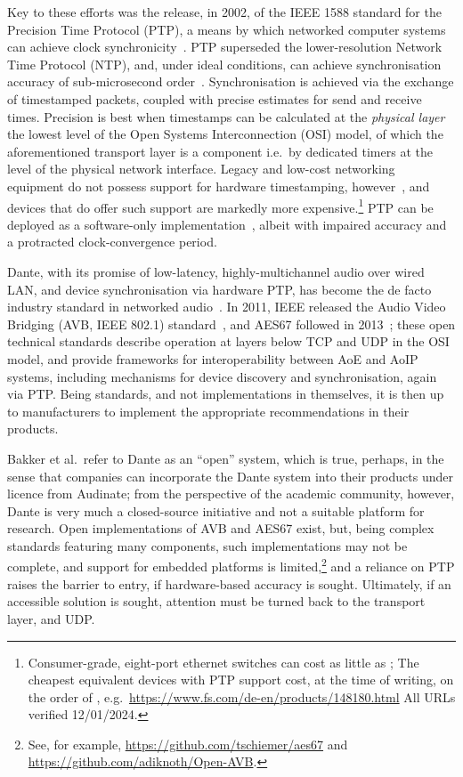 Key to these efforts was the release, in 2002, of the IEEE 1588 standard for the
Precision Time Protocol (PTP), a means by which networked computer systems
can achieve clock synchronicity~\citep{lee_proceedings_2005}.
PTP superseded the lower-resolution Network Time Protocol (NTP), and, under
ideal conditions, can achieve synchronisation accuracy of sub-microsecond
order~\citep{tongzhou_research_2022}.
Synchronisation is achieved via the exchange of timestamped packets, coupled
with precise estimates for send and receive times.
Precision is best when timestamps can be calculated at the \textit{physical
layer} \textemdash{} the lowest level of the Open Systems Interconnection (OSI)
model, of which the aforementioned transport layer is a component \textemdash{}
i.e.\ by dedicated timers at the level of the physical network interface.
Legacy and low-cost networking equipment do not possess support for hardware
timestamping, however~\citep{correll_design_2006}, and devices that do offer
such support are markedly more expensive.\footnote{
    Consumer-grade, eight-port ethernet switches can cost as little as
    ;
    The cheapest equivalent devices with PTP support cost, at the time of
    writing, on the order of , e.g.\
    \url{https://www.fs.com/de-en/products/148180.html} \textemdash{} All URLs
    verified 12/01/2024.
}
PTP can be deployed as a software-only
implementation~\citep{correll_design_2006}, albeit with impaired accuracy and
a protracted clock-convergence period.

Dante, with its promise of low-latency, highly-multichannel audio over wired
LAN, and device synchronisation via hardware PTP, has become the de facto
industry standard in networked audio~\citep{bakker_introduction_2014}.
In 2011, IEEE released the Audio Video Bridging (AVB, IEEE 802.1)
standard~\citep{ieee_ieee_2011}, and AES67 followed in
2013~\citep{hildebrand_aes67-2013_2014};
these open technical standards describe operation at layers below TCP and UDP
in the OSI model, and provide frameworks for
interoperability between AoE and AoIP systems, including mechanisms for device
discovery and synchronisation, again via PTP\@.
Being standards, and not implementations in themselves, it is then up to
manufacturers to implement the appropriate recommendations in their products.

Bakker et al.\ refer to Dante as an ``open'' system, which is true, perhaps, in
the sense that companies can incorporate the Dante system into their products
under licence from Audinate;
from the perspective of the academic community, however, Dante is very much a
closed-source initiative and not a suitable platform for research.
Open implementations of AVB and AES67 exist, but, being complex standards
featuring many components, such implementations may not be complete, and support
for embedded platforms is limited,\footnote{
    See, for example, \url{https://github.com/tschiemer/aes67} and
    \url{https://github.com/adiknoth/Open-AVB}.
} and a reliance on PTP raises the barrier to entry, if hardware-based accuracy
is sought.
Ultimately, if an accessible solution is sought, attention must be turned back
to the transport layer, and UDP\@.

